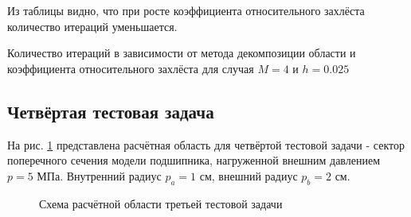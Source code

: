 \documentclass[a4paper]{article}
\begin{document}
Из таблицы видно, что при росте коэффициента относительного захлёста количество итераций уменьшается.

\begin{table}[h]
\caption{Количество итераций в зависимости от метода декомпозиции области и коэффициента относительного захлёста для случая $M = 4$ и $h = 0.025$}
\label{table:task_03_iters_overlap}
\end{table}

\newpage

\subsection{Четвёртая тестовая задача}

На рис. \ref{fig:task_04_scheme} представлена расчётная область для четвёртой тестовой задачи - сектор поперечного сечения модели подшипника, нагруженной внешним давлением $p = 5$ МПа. Внутренний радиус $p_a = 1$ см, внешний радиус $p_b = 2 $ см.

\begin{figure}[h]
\caption{Схема расчётной области третьей тестовой задачи}
\label{fig:task_04_scheme}
\end{figure}
\end{document}
